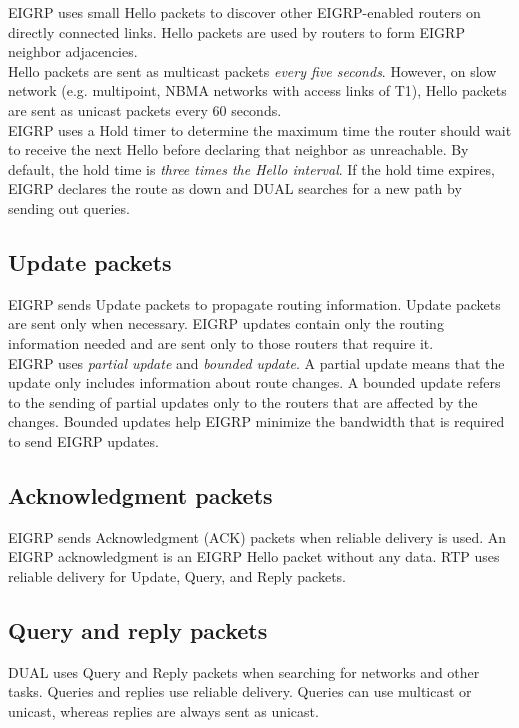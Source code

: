 EIGRP uses small Hello packets to discover other EIGRP-enabled routers on directly connected links. Hello packets are used by routers to form EIGRP neighbor adjacencies.\\
 
Hello packets are sent as multicast packets \emph{every five seconds}. However, on slow network (e.g. multipoint, NBMA networks with access links of T1), Hello packets are sent as unicast packets every 60 seconds.\\
 
EIGRP uses a Hold timer to determine the maximum time the router should wait to receive the next Hello before declaring that neighbor as unreachable. By default, the hold time is \emph{three times the Hello interval}. If the hold time expires, EIGRP declares the route as down and DUAL searches for a new path by sending out queries.

\subsection{Update packets}
EIGRP sends Update packets to propagate routing information. Update packets are sent only when necessary. EIGRP updates contain only the routing information needed and are sent only to those routers that require it.\\
 
EIGRP uses \emph{partial update} and \emph{bounded update}. A partial update means that the update only includes information about route changes. A bounded update refers to the sending of partial updates only to the routers that are affected by the changes. Bounded updates help EIGRP minimize the bandwidth that is required to send EIGRP updates.

\subsection{Acknowledgment packets}
EIGRP sends Acknowledgment (ACK) packets when reliable delivery is used. An EIGRP acknowledgment is an EIGRP Hello packet without any data. RTP uses reliable delivery for Update, Query, and Reply packets.
\subsection{Query and reply packets}
DUAL uses Query and Reply packets when searching for networks and other tasks. Queries and replies use reliable delivery. Queries can use multicast or unicast, whereas replies are always sent as unicast.
